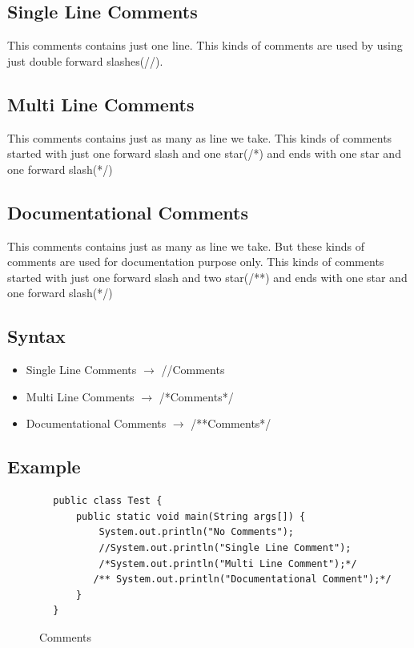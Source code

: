 \documentclass[A4 paper,openany]{book}  %
\begin{document}
\subsection{Single Line Comments}
This comments contains just one line. This kinds of comments are used by using just double forward slashes(//).
% 
%
\subsection{Multi Line Comments}
This comments contains just as many as line we take. This kinds of comments started with just one forward slash and one star(/*) and ends with one star and one forward slash(*/)
% 
%
\subsection{Documentational Comments}
This comments contains just as many as line we take. But these kinds of comments are used for documentation purpose only.
This kinds of comments started with just one forward slash and two star(/**) and ends with one star and one forward slash(*/)
% 
%
\subsection{Syntax}
\begin{itemize}
    \item Single Line Comments $\to$ //Comments
    \item Multi Line Comments $\to$ /*Comments*/
    \item Documentational Comments $\to$ /**Comments*/
\end{itemize}
% 
%
\subsection{Example}
\begin{center}
    \begin{verbatim}
        public class Test {
            public static void main(String args[]) {
                System.out.println("No Comments");
                //System.out.println("Single Line Comment");
                /*System.out.println("Multi Line Comment");*/
               /** System.out.println("Documentational Comment");*/
            }
        }
    \end{verbatim}
\end{center}
% 
% 
\begin{figure}[htbp]
    \begin{center}
        \caption{Comments\cite{Ref3}}
    \end{center}
\end{figure}
% 
% 
\end{document}
